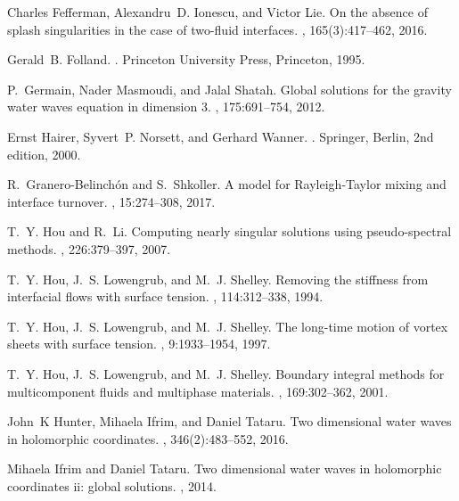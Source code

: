 \documentclass[11pt]{article}
\theoremstyle{plain}
\theoremstyle{definition}
\theoremstyle{definition}
\begin{document}
\begin{thebibliography}{10}
Charles Fefferman, Alexandru~D. Ionescu, and Victor Lie.
\newblock On the absence of splash singularities in the case of two-fluid
  interfaces.
, 165(3):417--462, 2016.

Gerald~B. Folland.
.
\newblock Princeton University Press, Princeton, 1995.

P.~Germain, Nader Masmoudi, and Jalal Shatah.
\newblock Global solutions for the gravity water waves equation in dimension 3.
, 175:691--754, 2012.

Ernst Hairer, Syvert~P. Norsett, and Gerhard Wanner.
.
\newblock Springer, Berlin, 2nd edition, 2000.

R.~Granero-Belinch\'{o}n and S.~Shkoller.
\newblock A model for Rayleigh-Taylor mixing and interface turnover.
, 15:274--308, 2017.

T.~Y. Hou and R.~Li.
\newblock Computing nearly singular solutions using pseudo-spectral methods.
, 226:379--397, 2007.

T.~Y. Hou, J.~S. Lowengrub, and M.~J. Shelley.
\newblock Removing the stiffness from interfacial flows with surface tension.
, 114:312--338, 1994.

T.~Y. Hou, J.~S. Lowengrub, and M.~J. Shelley.
\newblock The long-time motion of vortex sheets with surface tension.
, 9:1933--1954, 1997.

T.~Y. Hou, J.~S. Lowengrub, and M.~J. Shelley.
\newblock Boundary integral methods for multicomponent fluids and multiphase
  materials.
, 169:302--362, 2001.

John~K Hunter, Mihaela Ifrim, and Daniel Tataru.
\newblock Two dimensional water waves in holomorphic coordinates.
, 346(2):483--552, 2016.

Mihaela Ifrim and Daniel Tataru.
\newblock Two dimensional water waves in holomorphic coordinates ii: global
  solutions.
, 2014.


\end{thebibliography}
\end{document}
